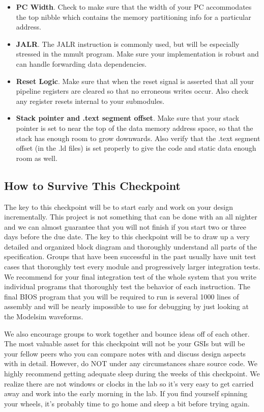 \documentclass[11pt]{article}
\begin{document}
\begin{itemize}
	\item \textbf{PC Width}. Check to make sure that the width of your PC accommodates the top nibble which contains the memory partitioning info for a particular address.
	
	\item \textbf{JALR}. The JALR instruction is commonly used, but will be especially stressed in the mmult program. Make sure your implementation is robust and can handle forwarding data dependencies.
	
	\item \textbf{Reset Logic}. Make sure that when the reset signal is asserted that all your pipeline registers are cleared so that no erroneous writes occur. Also check any register resets internal to your submodules.
	
	\item \textbf{Stack pointer and .text segment offset}. Make sure that your stack pointer is set to near the top of the data memory address space, so that the stack has enough room to grow downwards. Also verify that the .text segment offset (in the .ld files) is set properly to give the code and static data enough room as well.
\end{itemize}

\subsection{How to Survive This Checkpoint}
The key to this checkpoint will be to start early and work on your design incrementally. This project is not something that can be done with an all nighter and we can almost guarantee that you will not finish if you start two or three days before the due date. The key to this checkpoint will be to draw up a very detailed and organized block diagram and thoroughly understand all parts of the specification. Groups that have been successful in the past usually have unit test cases that thoroughly test every module and progressively larger integration tests. We recommend for your final integration test of the whole system that you write individual programs that thoroughly test the behavior of each instruction. The final BIOS program that you will be required to run is several 1000 lines of assembly and will be nearly impossible to use for debugging by just looking at the Modelsim waveforms.

We also encourage groups to work together and bounce ideas off of each other. The most valuable asset for this checkpoint will not be your GSIs but will be your fellow peers who you can compare notes with and discuss design aspects with in detail. However, do NOT under any circumstances share source code. We highly recommend getting adequate sleep during the weeks of this checkpoint. We realize there are not windows or clocks in the lab so it’s very easy to get carried away and work into the early morning in the lab. If you find yourself spinning your wheels, it’s probably time to go home and sleep a bit before trying again.
\end{document}
